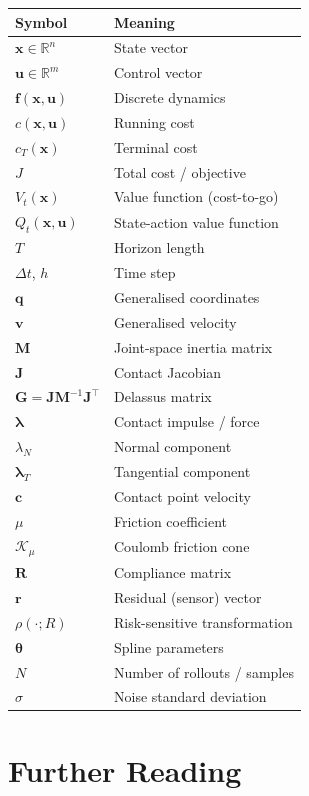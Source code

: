 \documentclass[11pt,twoside]{report}
\theoremstyle{definition}
\theoremstyle{plain}
\theoremstyle{remark}
\newcommand{\R}{\mathbb{R}}
\newcommand{\x}{\bm{x}}
\newcommand{\uu}{\bm{u}}
\newcommand{\f}{\bm{f}}
\newcommand{\q}{\bm{q}}
\newcommand{\rr}{\bm{r}}
\newcommand{\0}{\bm{0}}
\newcommand{\M}{\bm{M}}
\newcommand{\J}{\bm{J}}
\newcommand{\Kc}{\mathcal{K}}
\begin{document}
\begin{longtable}{ll}
\toprule
\textbf{Symbol} & \textbf{Meaning}\\
\midrule
$\x\in\R^{n}$ & State vector\\
$\uu\in\R^{m}$ & Control vector\\
$\f(\x,\uu)$ & Discrete dynamics\\
$c(\x,\uu)$ & Running cost\\
$c_{T}(\x)$ & Terminal cost\\
$J$ & Total cost / objective\\
$V_{t}(\x)$ & Value function (cost-to-go)\\
$Q_{t}(\x,\uu)$ & State-action value function\\
$T$ & Horizon length\\
$\Delta t$, $h$ & Time step\\
$\q$ & Generalised coordinates\\
$\bm{v}$ & Generalised velocity\\
$\M$ & Joint-space inertia matrix\\
$\J$ & Contact Jacobian\\
$\bm{G}=\J\M^{-1}\J^{\!\top}$ & Delassus matrix\\
$\bm{\lambda}$ & Contact impulse / force\\
$\lambda_{N}$ & Normal component\\
$\bm{\lambda}_{T}$ & Tangential component\\
$\bm{c}$ & Contact point velocity\\
$\mu$ & Friction coefficient\\
$\Kc_{\mu}$ & Coulomb friction cone\\
$\bm{R}$ & Compliance matrix\\
$\rr$ & Residual (sensor) vector\\
$\rho(\cdot;R)$ & Risk-sensitive transformation\\
$\bm{\theta}$ & Spline parameters\\
$N$ & Number of rollouts / samples\\
$\sigma$ & Noise standard deviation\\
\bottomrule
\end{longtable}


\chapter{Further Reading}
\end{document}
